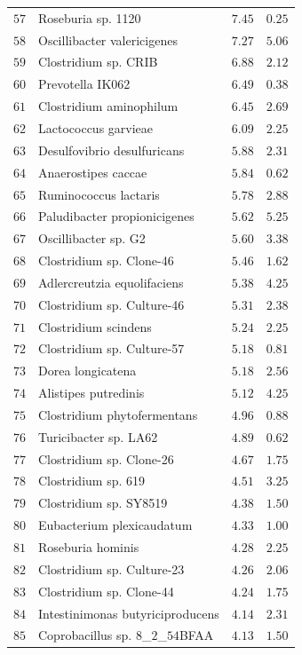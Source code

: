 \begin{center}
\begin{longtable}{|l|l|l|l|}
$57$ & Roseburia sp. 1120 & $7.45$ & $0.25$ \\
$58$ & Oscillibacter valericigenes & $7.27$ & $5.06$ \\
$59$ & Clostridium sp. CRIB & $6.88$ & $2.12$ \\
$60$ & Prevotella IK062 & $6.49$ & $0.38$ \\
$61$ & Clostridium aminophilum & $6.45$ & $2.69$ \\
$62$ & Lactococcus garvieae & $6.09$ & $2.25$ \\
$63$ & Desulfovibrio desulfuricans & $5.88$ & $2.31$ \\
$64$ & Anaerostipes caccae & $5.84$ & $0.62$ \\
$65$ & Ruminococcus lactaris & $5.78$ & $2.88$ \\
$66$ & Paludibacter propionicigenes & $5.62$ & $5.25$ \\
$67$ & Oscillibacter sp. G2 & $5.60$ & $3.38$ \\
$68$ & Clostridium sp. Clone-46 & $5.46$ & $1.62$ \\
$69$ & Adlercreutzia equolifaciens & $5.38$ & $4.25$ \\
$70$ & Clostridium sp. Culture-46 & $5.31$ & $2.38$ \\
$71$ & Clostridium scindens & $5.24$ & $2.25$ \\
$72$ & Clostridium sp. Culture-57 & $5.18$ & $0.81$ \\
$73$ & Dorea longicatena & $5.18$ & $2.56$ \\
$74$ & Alistipes putredinis & $5.12$ & $4.25$ \\
$75$ & Clostridium phytofermentans & $4.96$ & $0.88$ \\
$76$ & Turicibacter sp. LA62 & $4.89$ & $0.62$ \\
$77$ & Clostridium sp. Clone-26 & $4.67$ & $1.75$ \\
$78$ & Clostridium sp. 619 & $4.51$ & $3.25$ \\
$79$ & Clostridium sp. SY8519 & $4.38$ & $1.50$ \\
$80$ & Eubacterium plexicaudatum & $4.33$ & $1.00$ \\
$81$ & Roseburia hominis & $4.28$ & $2.25$ \\
$82$ & Clostridium sp. Culture-23 & $4.26$ & $2.06$ \\
$83$ & Clostridium sp. Clone-44 & $4.24$ & $1.75$ \\
$84$ & Intestinimonas butyriciproducens & $4.14$ & $2.31$ \\
$85$ & Coprobacillus sp. $8$\_$2$\_$54$BFAA & $4.13$ & $1.50$ \\

\end{longtable}
\end{center}
